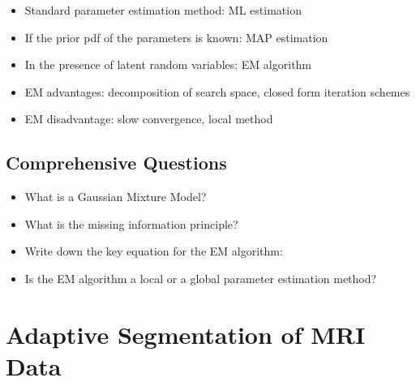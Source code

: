   \begin{itemize}
    \item Standard parameter estimation method: ML estimation      
    \item If the prior pdf of the parameters is known: MAP estimation      
    \item In the presence of latent random variables: EM algorithm      
    \item EM advantages: decomposition of search space, closed form iteration schemes      
    \item EM disadvantage: slow convergence, local method
  \end{itemize}


\subsection{Comprehensive Questions}

  \begin{itemize}
    \item What is a Gaussian Mixture Model?        
    \item What is the missing information principle?        
    \item Write down the key equation for the EM algorithm:        
    \item Is the EM algorithm a local or a global parameter estimation method?
  \end{itemize}
     
   \newpage  
\section{Adaptive Segmentation of MRI Data}\autocite{wells1996}

